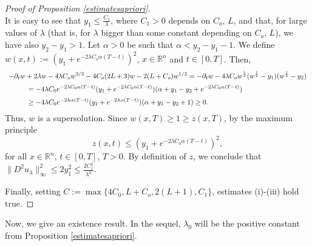 \documentclass{amsart}
\theoremstyle{remark}
\theoremstyle{definition}
\theoremstyle{Claim}
\theoremstyle{plain}
\begin{document}
\begin{proof}[Proof of Proposition \ref{estimatesapriori}]
\[		\]
		 It is easy to see that $y_1\leq \frac{C_1}{\lambda}$, where $C_1>0$ depends on $C_o$, $L$, and that, for large values of $\lambda$ (that is, for $\lambda$ bigger than some constant depending on $C_o$, $L$), we have also $y_2-y_1>1$. Let $\alpha>0$ be such that $\alpha<y_2-y_1-1$. We define $w(x,t):=(y_1+e^{-2\lambda C_o\alpha(T-t)})^2$, $x\in \mathbb{R}^n$ and $t\in [0,T]$. Then,
		$$\begin{array}{l}
			\vspace{0.2cm}\displaystyle{-\partial_t w+ 2\lambda w-4\lambda C_o w^{3/2}- 4C_o(2L+3) w-2 (L+C_o) w^{1/2}=-\partial_t w-4\lambda C_o  w^{\frac{1}{2}}(w^{\frac{1}{2}}-y_1)(w^{\frac{1}{2}}-y_2)}\\
			\vspace{0.2cm}\displaystyle{\hspace{1cm}=-4\lambda C_0e^{-2\lambda C_0\alpha(T-t)}(y_1+e^{-2\lambda C_0\alpha(T-t)})(\alpha +y_1-y_2+e^{-2\lambda C_0\alpha(T-t)})}\\
			\displaystyle{\hspace{1cm}\geq-4\lambda C_0 e^{-2\lambda\alpha(T-t)}(y_1+e^{-2\lambda\alpha(T-t)})(\alpha +y_1-y_2+1)\geq 0.}
		\end{array}$$
		Thus, $w$ is a supersolution. Since $w(x,T)\geq 1\geq z(x,T)$, by the maximum principle $$z(x,t)\leq (y_1+e^{-2\lambda C_o\alpha(T-t)})^2,$$
		for all $x\in \mathbb{R}^n$, $t\in [0,T]$, $T>0$. By definition of $z$, we conclude that $\lVert D^2u_\lambda\rVert_\infty^2\leq 2 y_1^2\leq \frac{2C_1^2}{\lambda^2}$.
		
		Finally, setting $C:=\max\{4C_0,L+C_o,2(L+1),C_1\}$, estimates (i)-(iii) hold true.
	\end{proof}
Now, we give an existence result. In the sequel, $\lambda_0$ will be the positive constant from Proposition \ref{estimatesapriori}.
\end{document}
